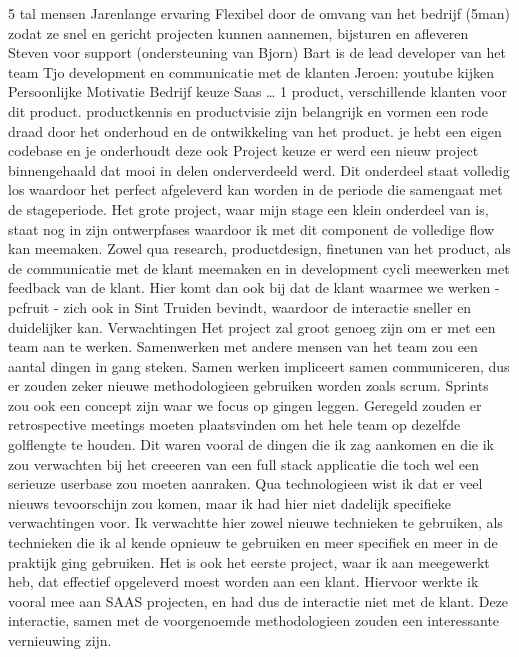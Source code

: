5 tal mensen
Jarenlange ervaring
Flexibel door de omvang van het bedrijf (5man) zodat ze snel en gericht projecten kunnen
aannemen, bijsturen en afleveren
Steven voor support (ondersteuning van Bjorn)
Bart is de lead developer van het team
Tjo development en communicatie met de klanten
Jeroen: youtube kijken
Persoonlijke Motivatie
Bedrijf keuze
Saas … 1 product, verschillende klanten voor dit product.
productkennis en productvisie zijn belangrijk en vormen een rode draad door het onderhoud
en de ontwikkeling van het product.
je hebt een eigen codebase en je onderhoudt deze ook
Project keuze
er werd een nieuw project binnengehaald dat mooi in delen onderverdeeld werd. Dit
onderdeel staat volledig los waardoor het perfect afgeleverd kan worden in de periode die
samengaat met de stageperiode.
Het grote project, waar mijn stage een klein onderdeel van is, staat nog in zijn
ontwerpfases waardoor ik met dit component de volledige flow kan meemaken. Zowel qua
research, productdesign, finetunen van het product, als de communicatie met de klant
meemaken en in development cycli meewerken met feedback van de klant. Hier komt dan ook
bij dat de klant waarmee we werken - pcfruit - zich ook in Sint Truiden bevindt, waardoor
de interactie sneller en duidelijker kan.
Verwachtingen
Het project zal groot genoeg zijn om er met een team aan te werken. Samenwerken met
andere mensen van het team zou een aantal dingen in gang steken. Samen werken impliceert
samen communiceren, dus er zouden zeker nieuwe methodologieen gebruiken worden zoals
scrum. Sprints zou ook een concept zijn waar we focus op gingen leggen. Geregeld zouden
er retrospective meetings moeten plaatsvinden om het hele team op dezelfde golflengte te
houden. Dit waren vooral de dingen die ik zag aankomen en die ik zou verwachten bij het
creeeren van een full stack applicatie die toch wel een serieuze userbase zou moeten
aanraken.
Qua technologieen wist ik dat er veel nieuws tevoorschijn zou komen, maar ik had hier
niet dadelijk specifieke verwachtingen voor. Ik verwachtte hier zowel nieuwe technieken
te gebruiken, als technieken die ik al kende opnieuw te gebruiken en meer specifiek en
meer in de praktijk ging gebruiken.
Het is ook het eerste project, waar ik aan meegewerkt heb, dat effectief opgeleverd moest
worden aan een klant. Hiervoor werkte ik vooral mee aan SAAS projecten, en had dus de
interactie niet met de klant. Deze interactie, samen met de voorgenoemde methodologieen
zouden een interessante vernieuwing zijn.
